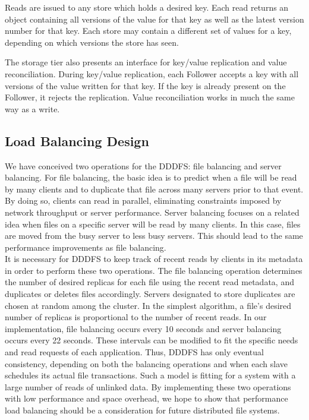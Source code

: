 \documentclass[twoside]{article}
\begin{document}
\begin{multicols}{2}
Reads are issued to any store which holds a desired key. Each read returns an object containing all versions of the value for that key as well as the latest version number for that key. Each store may contain a different set of values for a key, depending on which versions the store has seen.

The storage tier also presents an interface for key/value replication and value reconciliation. During key/value replication, each Follower accepts a key with all versions of the value written for that key. If the key is already present on the Follower, it rejects the replication. Value reconciliation works in much the same way as a write.

\subsection*{Load Balancing Design}
We have conceived two operations for the DDDFS: file balancing and server balancing. For file balancing, the basic idea is to predict when a file will be read by many clients and to duplicate that file across many servers prior to that event. By doing so, clients can read in parallel, eliminating constraints imposed by network throughput or server performance. Server balancing focuses on a related idea when files on a specific server will be read by many clients. In this case, files are moved from the busy server to less busy servers. This should lead to the same performance improvements as file balancing. \\\indent
It is necessary for DDDFS to keep track of recent reads by clients in its metadata in order to perform these two operations.  The file balancing operation determines the number of desired replicas for each file using the recent read metadata, and duplicates or deletes files accordingly. Servers designated to store duplicates are chosen at random among the cluster. In the simplest algorithm, a file's desired number of replicas is proportional to the number of recent reads. In our implementation, file balancing occurs every 10 seconds and server balancing occurs every 22 seconds. These intervals can be modified to fit the specific needs and read requests of each application. Thus, DDDFS has only eventual consistency, depending on both the balancing operations and when each slave schedules its actual file transactions. Such a model is fitting for a system with a large number of reads of unlinked data. By implementing these two operations with low performance and space overhead, we hope to show that performance load balancing should be a consideration for future distributed file systems. 


\end{multicols}
\end{document}
